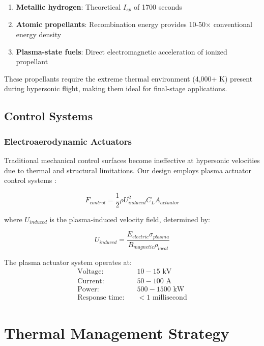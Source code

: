 \documentclass[12pt,a4paper]{article}
\begin{document}
\begin{enumerate}
\item \textbf{Metallic hydrogen}: Theoretical $I_{sp}$ of 1700 seconds \cite{silvera2017metallic}
\item \textbf{Atomic propellants}: Recombination energy provides 10-50$\times$ conventional energy density
\item \textbf{Plasma-state fuels}: Direct electromagnetic acceleration of ionized propellant
\end{enumerate}

These propellants require the extreme thermal environment (4,000+ K) present during hypersonic flight, making them ideal for final-stage applications.

\subsection{Control Systems}

\subsubsection{Electroaerodynamic Actuators}
Traditional mechanical control surfaces become ineffective at hypersonic velocities due to thermal and structural limitations. Our design employs plasma actuator control systems \cite{moreau2007airflow, roth2000electroaerodynamic}:

\begin{equation}
F_{control} = \frac{1}{2}\rho U_{induced}^2 C_L A_{actuator}
\label{eq:plasma_control_force}
\end{equation}

where $U_{induced}$ is the plasma-induced velocity field, determined by:

\begin{equation}
U_{induced} = \frac{E_{electric} \sigma_{plasma}}{B_{magnetic} \rho_{local}}
\label{eq:induced_velocity}
\end{equation}

The plasma actuator system operates at:
\begin{align}
\text{Voltage:} &\quad 10-15 \text{ kV} \\
\text{Current:} &\quad 50-100 \text{ A} \\
\text{Power:} &\quad 500-1500 \text{ kW} \\
\text{Response time:} &\quad < 1 \text{ millisecond}
\end{align}

\section{Thermal Management Strategy}
\end{document}
